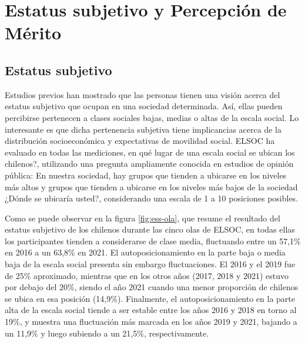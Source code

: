 \documentclass[
  12pt,
]{book}
\begin{document}
\hypertarget{estatus-subjetivo-y-percepciuxf3n-de-muxe9rito}{%
\section{Estatus subjetivo y Percepción de Mérito}\label{estatus-subjetivo-y-percepciuxf3n-de-muxe9rito}}

\hypertarget{estatus-subjetivo}{%
\subsection*{Estatus subjetivo}\label{estatus-subjetivo}}

Estudios previos han mostrado que las personas tienen una visión acerca del estatus subjetivo que ocupan en una sociedad determinada. Así, ellas pueden percibirse pertenecen a clases sociales bajas, medias o altas de la escala social. Lo interesante es que dicha pertenencia subjetiva tiene implicancias acerca de la distribución socioeconómica y expectativas de movilidad social. ELSOC ha evaluado en todas las mediciones, en qué lugar de una escala social se ubican los chilenos?, utilizando una pregunta ampliamente conocida en estudios de opinión pública: En nuestra sociedad, hay grupos que tienden a ubicarse en los niveles más altos y grupos que tienden a ubicarse en los niveles más bajos de la sociedad ¿Dónde se ubicaría usted?, considerando una escala de 1 a 10 posiciones posibles.

Como se puede observar en la figura \ref{fig:ess-ola}, que resume el resultado del estatus subjetivo de los chilenos durante las cinco olas de ELSOC, en todas ellas los participantes tienden a considerarse de clase media, fluctuando entre un 57,1\% en 2016 a un 63,8\% en 2021. El autoposicionamiento en la parte baja o media baja de la escala social presenta sin embargo fluctuaciones. El 2016 y el 2019 fue de 25\% aproximado, mientras que en los otros años (2017, 2018 y 2021) estuvo por debajo del 20\%, siendo el año 2021 cuando una menor proporción de chilenos se ubica en esa posición (14,9\%). Finalmente, el autoposicionamiento en la parte alta de la escala social tiende a ser estable entre los años 2016 y 2018 en torno al 19\%, y muestra una fluctuación más marcada en los años 2019 y 2021, bajando a un 11,9\% y luego subiendo a un 21,5\%, respectivamente.
\end{document}
